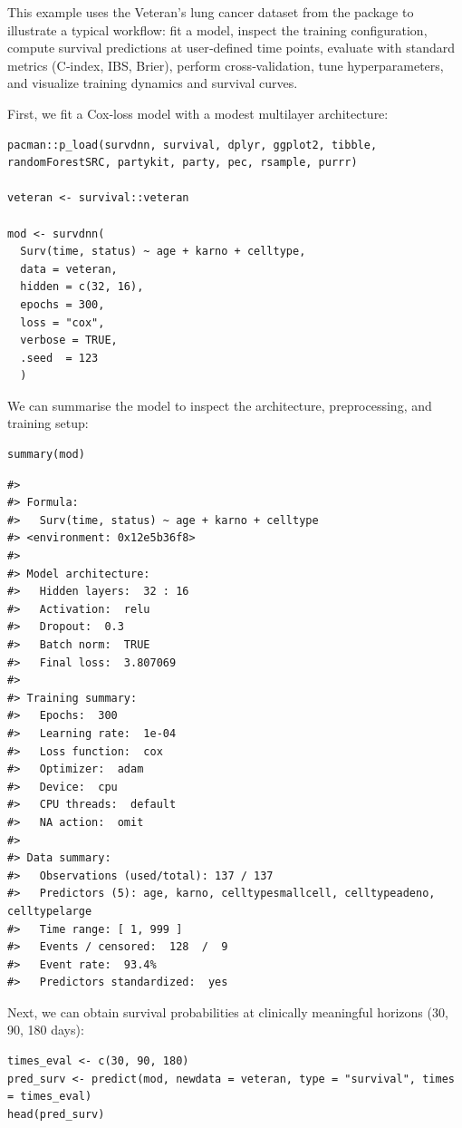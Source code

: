 This example uses the Veteran's lung cancer dataset from the  package \citep{survival-book} to illustrate a typical  workflow: fit a model, inspect the training configuration, compute survival predictions at user‑defined time points, evaluate with standard metrics (C‑index, IBS, Brier), perform cross‑validation, tune hyperparameters, and visualize training dynamics and survival curves.

First, we fit a Cox‑loss model with a modest multilayer architecture:

\begin{verbatim}
pacman::p_load(survdnn, survival, dplyr, ggplot2, tibble, randomForestSRC, partykit, party, pec, rsample, purrr)

veteran <- survival::veteran

mod <- survdnn(
  Surv(time, status) ~ age + karno + celltype,
  data = veteran,
  hidden = c(32, 16),
  epochs = 300,
  loss = "cox",
  verbose = TRUE,
  .seed  = 123
  )
\end{verbatim}

We can summarise the model to inspect the architecture, preprocessing, and training setup:

\begin{verbatim}
summary(mod)
\end{verbatim}

\begin{verbatim}
#> 
#> Formula:
#>   Surv(time, status) ~ age + karno + celltype
#> <environment: 0x12e5b36f8>
#> 
#> Model architecture:
#>   Hidden layers:  32 : 16 
#>   Activation:  relu 
#>   Dropout:  0.3 
#>   Batch norm:  TRUE 
#>   Final loss:  3.807069 
#> 
#> Training summary:
#>   Epochs:  300 
#>   Learning rate:  1e-04 
#>   Loss function:  cox 
#>   Optimizer:  adam 
#>   Device:  cpu 
#>   CPU threads:  default 
#>   NA action:  omit 
#> 
#> Data summary:
#>   Observations (used/total): 137 / 137
#>   Predictors (5): age, karno, celltypesmallcell, celltypeadeno, celltypelarge
#>   Time range: [ 1, 999 ]
#>   Events / censored:  128  /  9 
#>   Event rate:  93.4% 
#>   Predictors standardized:  yes
\end{verbatim}

Next, we can obtain survival probabilities at clinically meaningful horizons (30, 90, 180 days):

\begin{verbatim}
times_eval <- c(30, 90, 180)
pred_surv <- predict(mod, newdata = veteran, type = "survival", times = times_eval)
head(pred_surv)
\end{verbatim}

